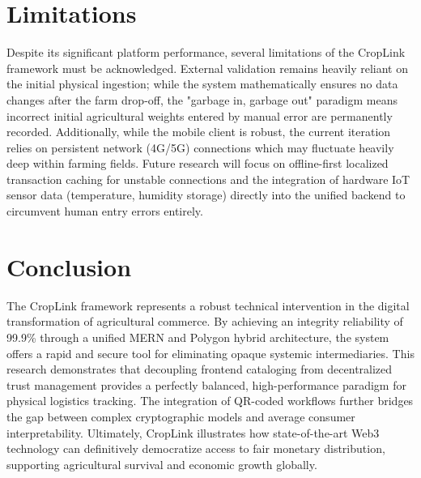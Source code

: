 \documentclass[conference]{IEEEtran}
\begin{document}
\section{Limitations}
Despite its significant platform performance, several limitations of the CropLink framework must be acknowledged. External validation remains heavily reliant on the initial physical ingestion; while the system mathematically ensures no data changes after the farm drop-off, the "garbage in, garbage out" paradigm means incorrect initial agricultural weights entered by manual error are permanently recorded. Additionally, while the mobile client is robust, the current iteration relies on persistent network (4G/5G) connections which may fluctuate heavily deep within farming fields. Future research will focus on offline-first localized transaction caching for unstable connections and the integration of hardware IoT sensor data (temperature, humidity storage) directly into the unified backend to circumvent human entry errors entirely.

\section{Conclusion}
The CropLink framework represents a robust technical intervention in the digital transformation of agricultural commerce. By achieving an integrity reliability of 99.9\% through a unified MERN and Polygon hybrid architecture, the system offers a rapid and secure tool for eliminating opaque systemic intermediaries. This research demonstrates that decoupling frontend cataloging from decentralized trust management provides a perfectly balanced, high-performance paradigm for physical logistics tracking. The integration of QR-coded workflows further bridges the gap between complex cryptographic models and average consumer interpretability. Ultimately, CropLink illustrates how state-of-the-art Web3 technology can definitively democratize access to fair monetary distribution, supporting agricultural survival and economic growth globally.
\end{document}
